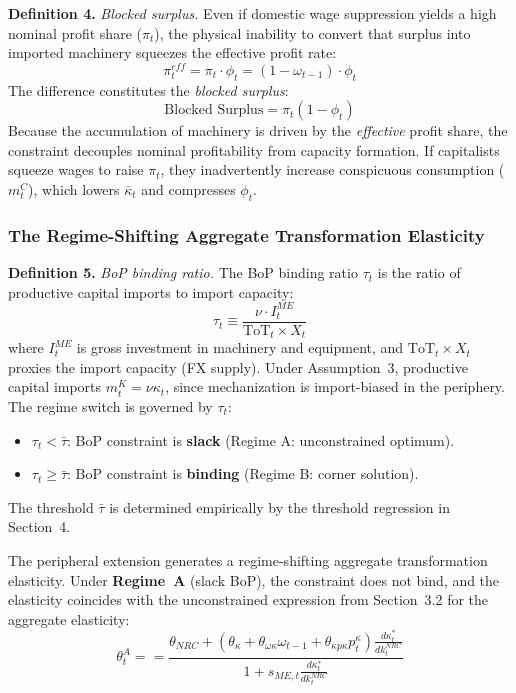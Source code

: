 \textbf{Definition 4.} \textit{Blocked surplus.} Even if
domestic wage suppression yields a high nominal profit share
($\pi_t$), the physical inability to convert that surplus into
imported machinery squeezes the effective profit rate:
\begin{equation}
	\pi_t^{eff} = \pi_t \cdot \phi_t
	= (1 - \omega_{t-1}) \cdot \phi_t
	\label{eq:33:pi_eff}
\end{equation}
The difference constitutes the \textit{blocked surplus}:
\begin{equation}
	\text{Blocked Surplus} = \pi_t(1 - \phi_t)
	\label{eq:33:blocked}
\end{equation}
Because the accumulation of machinery is driven by the
\textit{effective} profit share, the
constraint decouples nominal profitability from capacity
formation. If capitalists squeeze wages to raise $\pi_t$, they
inadvertently increase conspicuous consumption ($m^C_t$),
which lowers $\bar{\kappa}_t$ and compresses $\phi_t$.

\subsubsection{The Regime-Shifting Aggregate
	Transformation Elasticity}

\textbf{Definition 5.} \textit{BoP binding ratio.} The BoP
binding ratio $\tau_t$ is the ratio of productive capital
imports to import capacity:
\begin{equation}
	\tau_t \equiv \frac{\nu \cdot I^{ME}_t}
	{\text{ToT}_t \times X_t}
	\label{eq:33:tau}
\end{equation}
where $I^{ME}_t$ is gross investment in machinery and equipment, and $\text{ToT}_t \times X_t$
proxies the import capacity (FX supply). Under Assumption~3,
productive capital imports $m^K_t = \nu \kappa_t$, since mechanization is import-biased in the periphery. The regime switch is governed by $\tau_t$:
\begin{itemize}
	\item $\tau_t < \bar{\tau}$: BoP constraint is
	\textbf{slack} (Regime A: unconstrained optimum).
	\item $\tau_t \ge \bar{\tau}$: BoP constraint is
	\textbf{binding} (Regime B: corner solution).
\end{itemize}
The threshold $\bar{\tau}$ is determined empirically by the
threshold regression in Section~4.

The peripheral extension generates a regime-shifting
aggregate transformation elasticity. Under \textbf{Regime~A}
(slack BoP), the constraint does not bind, and the
elasticity coincides with the unconstrained expression from
Section~3.2 for the aggregate elasticity:
\begin{equation}
	\theta^{A}_t = 
	= \frac{\theta_{NRC}
		+ \left(\theta_\kappa + \theta_{\omega\kappa}\omega_{t-1}
		+ \theta_{\kappa p\kappa} p^\kappa_t\right)
		\frac{d\kappa_t^*}{dk^{NRC}_t}}
	{1 + s_{ME,t}\frac{d\kappa_t^*}{dk^{NRC}_t}}
	\label{eq:33:theta_A}
\end{equation}

